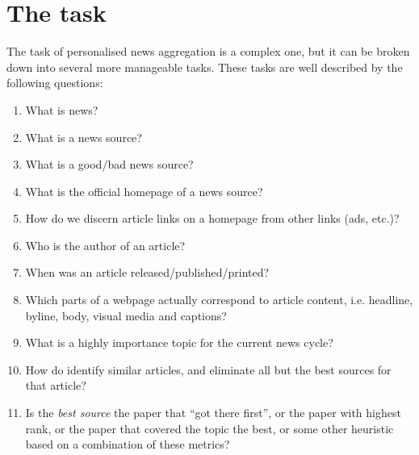 \section{The task\label{task}}
The task of personalised news aggregation is a complex one, but it can
be broken down into several more manageable tasks.  These tasks are
well described by the following questions:
\begin{enumerate}
    \item What is news?
    \item What is a news source?
    \item What is a good/bad news source?
    \item What is the official homepage of a news source?
    \item How do we discern article links on a homepage from other
          links (ads, etc.)?
    \item Who is the author of an article?
    \item When was an article released/published/printed?
    \item Which parts of a webpage actually correspond to article content,
          i.e. headline, byline, body, visual media and captions?
    \item What is a highly importance topic for the current
          news cycle?
    \item How do identify similar articles, and eliminate all but the best
          sources for that article?
    \item Is the {\it best source} the paper that ``got there first'', or
          the paper with highest rank, or the paper that covered the
          topic the best, or some other heuristic based on a
          combination of these metrics?
\end{enumerate}